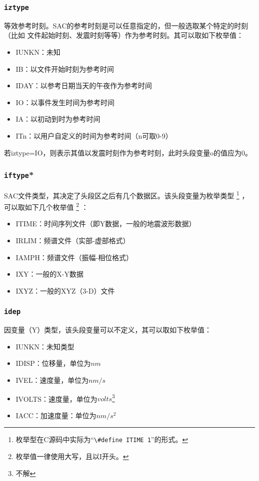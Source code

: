 \subsubsection{\texttt{iztype}}
等效参考时刻。SAC的参考时刻是可以任意指定的，但一般选取某个特定的时刻（比如
文件起始时刻、发震时刻等等）作为参考时刻。其可以取如下枚举值：
\begin{itemize}
\ttfamily
\item IUNKN：未知
\item IB：以文件开始时刻为参考时间
\item IDAY：以参考日期当天的午夜作为参考时间
\item IO：以事件发生时间为参考时间
\item IA：以初动到时为参考时间
\item ITn：以用户自定义的时间为参考时间（n可取0-9）
\end{itemize}

若iztype=IO，则表示其值以发震时刻作为参考时刻，此时头段变量o的值应为0。

\subsubsection{\texttt{iftype}*}
SAC文件类型，其决定了头段区之后有几个数据区。该头段变量为枚举类型
\footnote{枚举型在C源码中实际为``\lstinline{\#define ITIME 1}''的形式。}
，可以取如下几个枚举值
\footnote{枚举值一律使用大写，且以I开头。} ：
\begin{itemize}
\ttfamily
\item ITIME：时间序列文件（即Y数据，一般的地震波形数据）
\item IRLIM：频谱文件（实部-虚部格式）
\item IAMPH：频谱文件（振幅-相位格式）
\item IXY：一般的X-Y数据
\item IXYZ：一般的XYZ（3-D）文件
\end{itemize}

\subsubsection{\texttt{idep}}
因变量（Y）类型，该头段变量可以不定义，其可以取如下枚举值：
\begin{itemize}
\ttfamily
\item IUNKN：未知类型
\item IDISP：位移量，单位为$nm$
\item IVEL：速度量，单位为$nm/s$
\item IVOLTS：速度量，单位为$volts$\footnote{不解}
\item IACC：加速度量：单位为$nm/s^2$	
\end{itemize}


